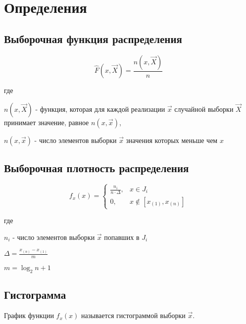 \chapter{Определения}
\section{Выборочная функция распределения}
\begin{equation}
\hat{F}(x, \vec{X}) = \frac{n(x, \vec{X})}{n}
\end{equation}

где 

$n(x, \vec{X})$ - функция, которая для каждой реализации $\vec{x}$ случайной выборки $\vec{X}$ принимает значение, равное $n(x, \vec{x})$,

$n(x, \vec{x})$ - число элементов выборки $\vec{x}$ значения которых меньше чем $x$

\section{Выборочная плотность распределения}

\begin{equation}
f_x(x) = 
 \begin{cases}
   \frac{n_i}{n \cdot \Delta}, &\text{$x \in J_i$}\\
   0, &\text{$x \notin [x_{(1)}, x_{(n)}]$}
 \end{cases}
\end{equation}

где 

$n_i$ - число элементов выборки $\vec{x}$ попавших в $J_i$

$\Delta = \frac{x_{(n)} - x_{(1)}}{m}$

$m = \log_{2} n + 1$

\section{Гистограмма}
График функции $f_x(x)$ называется гистограммой выборки $\vec{x}$.
